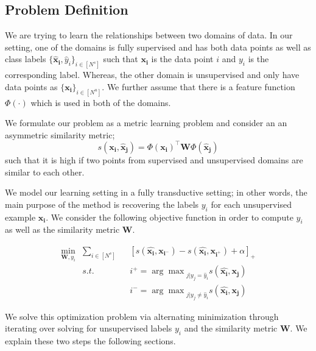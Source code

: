 \subsection{Problem Definition}
We are trying to learn the relationships between two domains of data. In our setting, one of the domains is fully supervised and has both data points as well as class labels $\{\mathbf{\hat{x}_i}, \hat{y}_i\}_{i \in [N^s]}$ such that $\mathbf{x_i}$ is the data point $i$ and $y_i$ is the corresponding label. Whereas, the other domain is unsupervised and only have data points as $\{\mathbf{x_i}\}_{i \in [N^u]}$. We further assume that there is a feature function $\Phi(\cdot)$ which is used in both of the domains.

We formulate our problem as a metric learning problem and consider an an asymmetric similarity metric;
\begin{equation}
s(\mathbf{x_i}, \mathbf{\hat{x}_j}) = \Phi(\mathbf{x_i})^\intercal \mathbf{W} \Phi(\mathbf{\hat{x}_j})
\end{equation}
such that it is high if two points from supervised and unsupervised domains are similar to each other.

We model our learning setting in a fully transductive setting; in other words, the main purpose of the method is recovering the labels $y_i$ for each unsupervised example $\mathbf{x_i}$. We consider the following objective function in order to compute $y_i$ as well as the similarity metric $\mathbf{W}$.

\begin{equation}
\begin{aligned}
\min_{\mathbf{W}, y_i} &\sum_{i \in [N^s]} &&[s(\mathbf{\hat{x_i}},\mathbf{x_{i^-}}) - s(\mathbf{\hat{x_i}},\mathbf{x_{i^+}}) + \alpha]_{+} \\
&s.t. \quad &&i^{+} = {\arg\max}_{j | y_j = \hat{y}_i} s(\mathbf{\hat{x_i}},\mathbf{x_{j}}) \\
&\quad &&i^{-} = {\arg\max}_{j | y_j \neq \hat{y}_i} s(\mathbf{\hat{x_i}},\mathbf{x_{j}}) 
\end{aligned}
\label{loss}
\end{equation}

We solve this optimization problem via alternating minimization through iterating over solving for unsupervised labels $y_i$ and the similarity metric $\mathbf{W}$. We explain these two steps the following sections.

